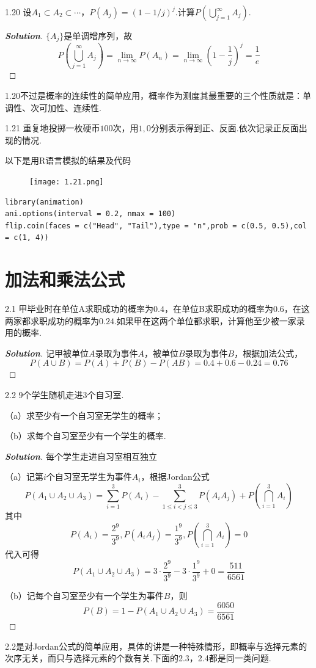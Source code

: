 \documentclass[10pt, a4paper, oneside]{ctexart}
\newenvironment{solution}{\begin{proof}[\bf Solution]}{\end{proof}}
\begin{document}
1.20 设$A_1\subset A_2\subset \cdots$，$P(A_j)=(1-1/j)^j$.计算$P(\bigcup\limits_{j = 1}^\infty  {{A_j}} )$.
\begin{solution}
$\{A_j\}$是单调增序列，故
\[
P(\bigcup\limits_{j = 1}^\infty  {{A_j}} ) = \mathop {\lim }\limits_{n \to \infty } P({A_n}) = \mathop {\lim }\limits_{n \to \infty } {(1 - \frac{1}{j})^j} = \frac{1}{e}
\]
\end{solution}
\begin{remark}
1.20不过是概率的连续性的简单应用，概率作为测度其最重要的三个性质就是：单调性、次可加性、连续性.
\end{remark}

1.21 重复地投掷一枚硬币$100$次，用$1,0$分别表示得到正、反面.依次记录正反面出现的情况.

以下是用R语言模拟的结果及代码
\begin{figure}[h]
    \centering
    \texttt{[image: 1.21.png]}
\end{figure}
\begin{lstlisting}
library(animation)
ani.options(interval = 0.2, nmax = 100)
flip.coin(faces = c("Head", "Tail"),type = "n",prob = c(0.5, 0.5),col = c(1, 4))
\end{lstlisting}

\newpage
\section{加法和乘法公式}
2.1 甲毕业时在单位A求职成功的概率为$0.4$，在单位B求职成功的概率为$0.6$，在这两家都求职成功的概率为$0.24$.如果甲在这两个单位都求职，计算他至少被一家录用的概率.
\begin{solution}
记甲被单位$A$录取为事件$A$，被单位$B$录取为事件$B$，根据加法公式，
\[P(A \cup B) = P(A) + P(B) - P(AB) = 0.4 + 0.6 - 0.24 = 0.76\]
\end{solution}

2.2 $9$个学生随机走进$3$个自习室.

（a）求至少有一个自习室无学生的概率；

（b）求每个自习室至少有一个学生的概率.
\begin{solution}
每个学生走进自习室相互独立

（a）记第$i$个自习室无学生为事件$A_i$，根据Jordan公式
\[P({A_1} \cup {A_2} \cup {A_3}) = \sum\limits_{i = 1}^3 {P({A_i})}  - \sum\limits_{1 \leqslant i < j \leqslant 3}^3 {P({A_i}{A_j})}  + P(\bigcap\limits_{i = 1}^3 {{A_i}} )\]
其中
\[P({A_i}) = \frac{{{2^9}}}{{{3^9}}},P({A_i}{A_j}) = \frac{{{1^9}}}{{{3^9}}},P(\bigcap\limits_{i = 1}^3 {{A_i}} ) = 0\]
代入可得
\[P({A_1} \cup {A_2} \cup {A_3}) = 3 \cdot \frac{{{2^9}}}{{{3^9}}} - 3 \cdot \frac{{{1^9}}}{{{3^9}}} + 0 = \frac{{511}}{{6561}}\]

（b）记每个自习室至少有一个学生为事件$B$，则
\[P(B) = 1 - P({A_1} \cup {A_2} \cup {A_3}) = \frac{{6050}}{{6561}}\]
\end{solution}
\begin{remark}
2.2是对Jordan公式的简单应用，具体的讲是一种特殊情形，即概率与选择元素的次序无关，而只与选择元素的个数有关.下面的2.3，2.4都是同一类问题.
\end{remark}
\end{document}
